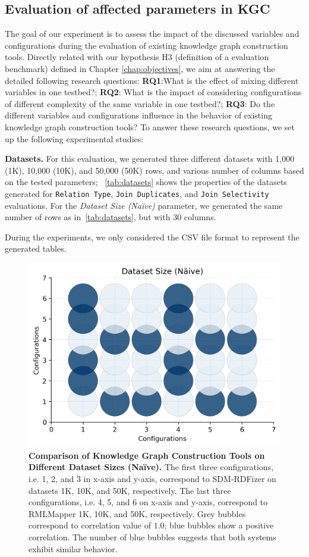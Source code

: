 \subsection{Evaluation of affected parameters in KGC}
The goal of our experiment is to assess the impact of the discussed variables and configurations during the evaluation of existing knowledge graph construction tools. Directly related with our hypothesis H3 (definition of a evaluation benchmark) defined in Chapter \ref{chap:objectives}, we aim at answering the detailed following research questions: \textbf{RQ1}:What is the effect of mixing different variables in one testbed?; \textbf{RQ2}: What is the impact of considering configurations of different complexity of the same variable in one testbed?; \textbf{RQ3}: Do the different variables and configurations influence in the behavior of existing knowledge graph construction tools? To answer these research questions, we set up the following experimental studies:

\noindent \textbf{Datasets.}
For this evaluation, we generated three different datasets with 1,000 (1K), 10,000 (10K), and 50,000 (50K) rows, and various number of columns based on the tested parameters; ~\autoref{tab:datasets} shows the properties of the datasets generated for \texttt{Relation Type}, \texttt{Join Duplicates}, and \texttt{Join Selectivity} evaluations. 
For the \textit{Dataset Size (Na{\"i}ve)} parameter, we generated the same number of rows as in~\autoref{tab:datasets}, but with $30$ columns.

%
During the experiments, we only considered the CSV file format to represent the generated tables.

\begin{figure}[!tb]
    \centering
    \includegraphics[width=0.8\columnwidth]{figures/naive_allk_bubble.png}
    \caption[Knowledge Graph Construction Tools on Different Dataset Sizes (Na{\"i}ve)]{\textbf{Comparison of Knowledge Graph Construction Tools on Different Dataset Sizes (Na{\"i}ve).} The first three configurations, i.e. 1, 2, and 3 in x-axis and y-axis, correspond to SDM-RDFizer on datasets 1K, 10K, and 50K, respectively. The last three configurations, i.e. 4, 5, and 6 on x-axis and y-axis, correspond to RMLMapper 1K, 10K, and 50K, respectively. Grey bubbles correspond to correlation value of $1.0$; blue bubbles show a positive correlation. The number of blue bubbles suggests that both systems exhibit similar behavior.}
    \label{fig:naive_bubble}
\end{figure}

